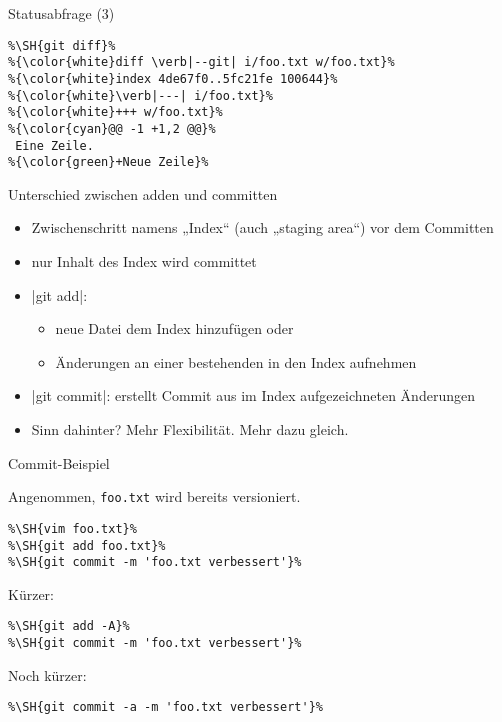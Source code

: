 \begin{frame}[fragile=singleslide]{Statusabfrage (3)}
\begin{example}
\begin{lstlisting}
%\SH{git diff}%
%{\color{white}diff \verb|--git| i/foo.txt w/foo.txt}%
%{\color{white}index 4de67f0..5fc21fe 100644}%
%{\color{white}\verb|---| i/foo.txt}%
%{\color{white}+++ w/foo.txt}%
%{\color{cyan}@@ -1 +1,2 @@}%
 Eine Zeile.
%{\color{green}+Neue Zeile}%
\end{lstlisting}
\end{example}
\end{frame}

\begin{frame}[fragile=singleslide]{Unterschied zwischen adden und committen}
\begin{itemize}
	\item Zwischenschritt namens „Index“ (auch „staging area“) vor dem Committen
	\item nur Inhalt des Index wird committet
	\item \TYPE|git add|:\begin{itemize}
		\item neue Datei dem Index hinzufügen oder
		\item Änderungen an einer bestehenden in den Index aufnehmen
	\end{itemize}
	\item \TYPE|git commit|: erstellt Commit aus im Index aufgezeichneten Änderungen
	\item Sinn dahinter? Mehr Flexibilität. Mehr dazu gleich.
\end{itemize}
\end{frame}

\begin{frame}[fragile=singleslide]{Commit-Beispiel}
\begin{example}
\small{Angenommen, \texttt{foo.txt} wird bereits versioniert.}
\begin{lstlisting}
%\SH{vim foo.txt}%
%\SH{git add foo.txt}%
%\SH{git commit -m 'foo.txt verbessert'}%
\end{lstlisting}
\small{Kürzer:}
\begin{lstlisting}
%\SH{git add -A}%
%\SH{git commit -m 'foo.txt verbessert'}%
\end{lstlisting}
\small{Noch kürzer:}
\begin{lstlisting}
%\SH{git commit -a -m 'foo.txt verbessert'}%
\end{lstlisting}
\end{example}
\end{frame}





